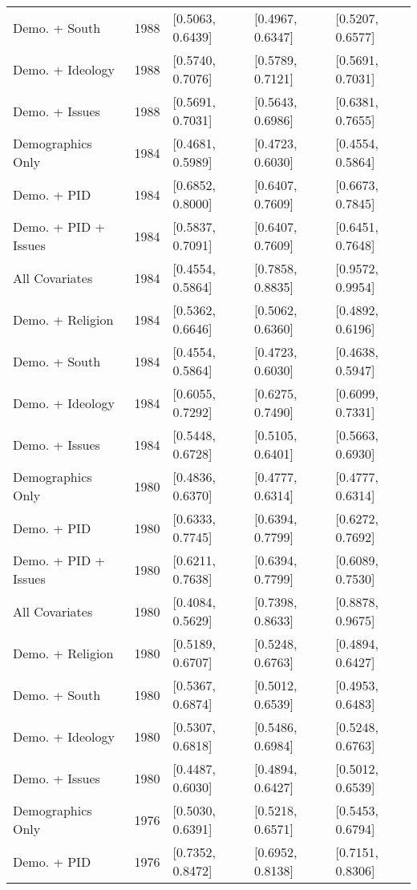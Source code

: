 \begin{longtable}{lrlll}
  Demo. + South & 1988 & [0.5063, 0.6439] & [0.4967, 0.6347] & [0.5207, 0.6577] \\ 
  Demo. + Ideology & 1988 & [0.5740, 0.7076] & [0.5789, 0.7121] & [0.5691, 0.7031] \\ 
  Demo. + Issues & 1988 & [0.5691, 0.7031] & [0.5643, 0.6986] & [0.6381, 0.7655] \\ 
  Demographics Only & 1984 & [0.4681, 0.5989] & [0.4723, 0.6030] & [0.4554, 0.5864] \\ 
  Demo. + PID & 1984 & [0.6852, 0.8000] & [0.6407, 0.7609] & [0.6673, 0.7845] \\ 
  Demo. + PID + Issues & 1984 & [0.5837, 0.7091] & [0.6407, 0.7609] & [0.6451, 0.7648] \\ 
  All Covariates & 1984 & [0.4554, 0.5864] & [0.7858, 0.8835] & [0.9572, 0.9954] \\ 
  Demo. + Religion & 1984 & [0.5362, 0.6646] & [0.5062, 0.6360] & [0.4892, 0.6196] \\ 
  Demo. + South & 1984 & [0.4554, 0.5864] & [0.4723, 0.6030] & [0.4638, 0.5947] \\ 
  Demo. + Ideology & 1984 & [0.6055, 0.7292] & [0.6275, 0.7490] & [0.6099, 0.7331] \\ 
  Demo. + Issues & 1984 & [0.5448, 0.6728] & [0.5105, 0.6401] & [0.5663, 0.6930] \\ 
  Demographics Only & 1980 & [0.4836, 0.6370] & [0.4777, 0.6314] & [0.4777, 0.6314] \\ 
  Demo. + PID & 1980 & [0.6333, 0.7745] & [0.6394, 0.7799] & [0.6272, 0.7692] \\ 
  Demo. + PID + Issues & 1980 & [0.6211, 0.7638] & [0.6394, 0.7799] & [0.6089, 0.7530] \\ 
  All Covariates & 1980 & [0.4084, 0.5629] & [0.7398, 0.8633] & [0.8878, 0.9675] \\ 
  Demo. + Religion & 1980 & [0.5189, 0.6707] & [0.5248, 0.6763] & [0.4894, 0.6427] \\ 
  Demo. + South & 1980 & [0.5367, 0.6874] & [0.5012, 0.6539] & [0.4953, 0.6483] \\ 
  Demo. + Ideology & 1980 & [0.5307, 0.6818] & [0.5486, 0.6984] & [0.5248, 0.6763] \\ 
  Demo. + Issues & 1980 & [0.4487, 0.6030] & [0.4894, 0.6427] & [0.5012, 0.6539] \\ 
  Demographics Only & 1976 & [0.5030, 0.6391] & [0.5218, 0.6571] & [0.5453, 0.6794] \\ 
  Demo. + PID & 1976 & [0.7352, 0.8472] & [0.6952, 0.8138] & [0.7151, 0.8306] \\ 

\end{longtable}
